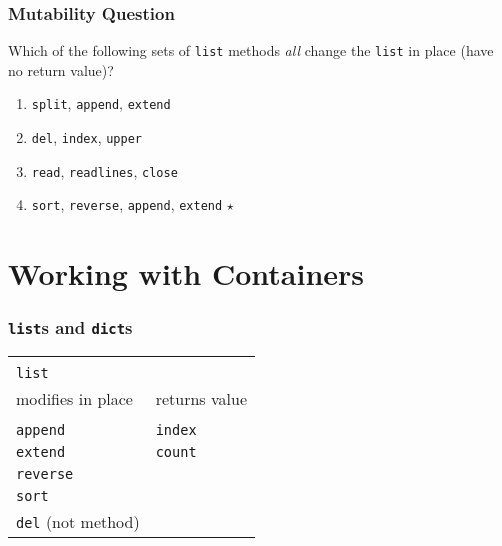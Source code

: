 \documentclass[11pt]{beamer}
\begin{document}
\begin{frame}[fragile]
  \frametitle{Mutability Question}
  \Enlarge

  Which of the following sets of \texttt{list} methods \emph{all} change the \texttt{list} in place (have no return value)?

  \begin{enumerate}[label=\Alph*]
  \item  \texttt{split}, \textcolor{CS101Alt}{\texttt{append}}, \textcolor{CS101Alt}{\texttt{extend}}
  \item  \textcolor{CS101Alt}{\texttt{del}}, \texttt{index}, \texttt{upper}
  \item  \texttt{read}, \texttt{readlines}, \texttt{close}
  \item  \textcolor{CS101Alt}{\texttt{sort}}, \textcolor{CS101Alt}{\texttt{reverse}}, \textcolor{CS101Alt}{\texttt{append}}, \textcolor{CS101Alt}{\texttt{extend}}  $\star$
  \end{enumerate}
\end{frame}

\section{Working with Containers}

\begin{frame}[fragile]
  \frametitle{\texttt{list}s and \texttt{dict}s}
  \Enlarge

  \begin{tabular}{ll}
  \hline\hline \\
  \texttt{list} & \\
  modifies in place \hspace{2cm} & returns value \\
  \hline \\
  \texttt{append} & \texttt{index} \\
  \texttt{extend} & \texttt{count} \\
  \texttt{reverse} &  \\
  \texttt{sort} &  \\
  \texttt{del} (not method) &  \\
  \end{tabular}
\end{frame}
\end{document}

